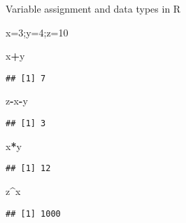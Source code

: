 \documentclass[ignorenonframetext,]{beamer}
\newenvironment{Shaded}{\begin{snugshade}}{\end{snugshade}}
\newcommand{\DecValTok}[1]{\textcolor[rgb]{0.00,0.00,0.81}{#1}}
\newcommand{\OperatorTok}[1]{\textcolor[rgb]{0.81,0.36,0.00}{\textbf{#1}}}
\newcommand{\NormalTok}[1]{#1}
\begin{document}
\begin{frame}[fragile]{Variable assignment and data types in R}

\begin{Shaded}
\begin{Highlighting}[]
\NormalTok{x=}\DecValTok{3}\NormalTok{;y=}\DecValTok{4}\NormalTok{;z=}\DecValTok{10}

\NormalTok{x}\OperatorTok{+}\NormalTok{y}
\end{Highlighting}
\end{Shaded}

\begin{verbatim}
## [1] 7
\end{verbatim}

\begin{Shaded}
\begin{Highlighting}[]
\NormalTok{z}\OperatorTok{-}\NormalTok{x}\OperatorTok{-}\NormalTok{y}
\end{Highlighting}
\end{Shaded}

\begin{verbatim}
## [1] 3
\end{verbatim}

\begin{Shaded}
\begin{Highlighting}[]
\NormalTok{x}\OperatorTok{*}\NormalTok{y}
\end{Highlighting}
\end{Shaded}

\begin{verbatim}
## [1] 12
\end{verbatim}

\begin{Shaded}
\begin{Highlighting}[]
\NormalTok{z}\OperatorTok{^}\NormalTok{x}
\end{Highlighting}
\end{Shaded}

\begin{verbatim}
## [1] 1000
\end{verbatim}

\end{frame}
\end{document}
